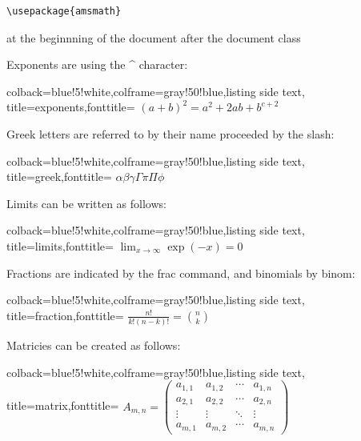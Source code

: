 \begin{verbatim}
\usepackage{amsmath}
\end{verbatim}

at the beginnning of the document after the document class

Exponents are using the \^{} character:

\begin{tcblisting}{colback=blue!5!white,colframe=gray!50!blue,listing side text,
  title=exponents,fonttitle=\bfseries}
$(a+b)^2 = a^2 + 2ab + b^{c+2}$
\end{tcblisting} 

Greek letters are referred to by their name proceeded by the slash:

\begin{tcblisting}{colback=blue!5!white,colframe=gray!50!blue,listing side text,
  title=greek,fonttitle=\bfseries}
$ \alpha \beta \gamma \Gamma \pi \Pi \phi $
\end{tcblisting}


Limits can be written as follows:

\begin{tcblisting}{colback=blue!5!white,colframe=gray!50!blue,listing side text,  title=limits,fonttitle=\bfseries}
$ \lim_{x \to \infty} \exp(-x) = 0 $
\end{tcblisting}

Fractions are indicated by the frac command, and binomials by binom:

\begin{tcblisting}{colback=blue!5!white,colframe=gray!50!blue,listing side text,  title=fraction,fonttitle=\bfseries}
$ \frac{n!}{k!(n-k)!} = \binom{n}{k} $   
\end{tcblisting}

Matricies can be created as follows:

\begin{tcblisting}{colback=blue!5!white,colframe=gray!50!blue,listing side text,  title=matrix,fonttitle=\bfseries}
$ A_{m,n} = 
\begin{pmatrix}
  a_{1,1} & a_{1,2} & \cdots & a_{1,n} \\
  a_{2,1} & a_{2,2} & \cdots & a_{2,n} \\
  \vdots  & \vdots  & \ddots & \vdots  \\
  a_{m,1} & a_{m,2} & \cdots & a_{m,n} 
\end{pmatrix} $
\end{tcblisting}



